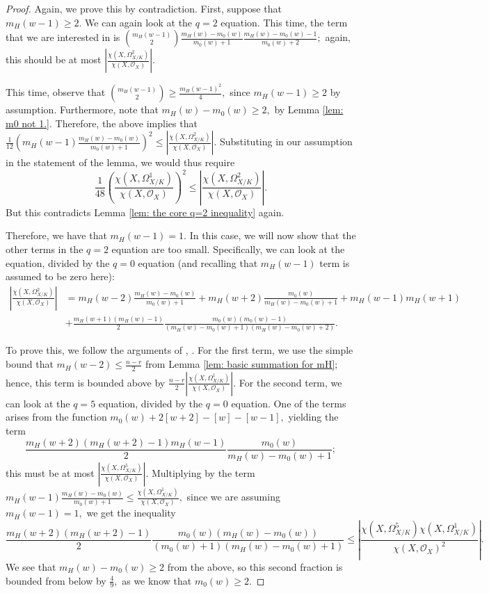 \documentclass{article}
\theoremstyle{definition}
\theoremstyle{remark}
\begin{document}
\begin{proof}
Again, we prove this by contradiction. First, suppose that $m_H(w-1) \geq 2.$ We can again look at the $q = 2$ equation. This time, the term that we are interested in is $\binom{m_H(w-1)}{2} \frac{m_H(w) - m_0(w)}{m_0(w) + 1} \frac{m_H(w) - m_0(w) - 1}{m_0(w) + 2};$ again, this should be at most $\left|\frac{\chi(X, \Omega^2_{X/K})}{\chi(X, \mathcal{O}_X)}\right|.$
\par This time, observe that $\binom{m_H(w-1)}{2} \geq \frac{m_H(w-1)^2}{4},$ since $m_H(w-1) \geq 2$ by assumption. Furthermore, note that $m_H(w) - m_0(w) \geq 2,$ by Lemma \ref{lem: m0 not 1.}. Therefore, the above implies that $\frac{1}{12} \left(m_H(w-1) \frac{m_H(w) - m_0(w)}{m_0(w) + 1}\right)^2 \leq \left|\frac{\chi(X, \Omega^2_{X/K})}{\chi(X, \mathcal{O}_X)}\right|.$ Substituting in our assumption in the statement of the lemma, we would thus require \[\frac{1}{48} \left(\frac{\chi(X, \Omega^1_{X/K})}{\chi(X, \mathcal{O}_X)}\right)^2 \leq \left|\frac{\chi(X, \Omega^2_{X/K})}{\chi(X, \mathcal{O}_X)}\right|.\] But this contradicts Lemma \ref{lem: the core q=2 inequality} again.
\par Therefore, we have that $m_H(w-1) = 1.$ In this case, we will now show that the other terms in the $q=2$ equation are too small. Specifically, we can look at the equation, divided by the $q = 0$ equation (and recalling that $m_H(w-1)$ term is assumed to be zero here):
\begin{align*} \left|\frac{\chi(X, \Omega^2_{X/K})}{\chi(X, \mathcal{O}_X)}\right|  & = m_H(w-2) \frac{m_H(w) - m_0(w)}{m_0(w) + 1} + m_H(w+2)\frac{m_0(w)}{m_H(w) - m_0(w) + 1} + m_H(w-1)m_H(w+1) \\ & + \frac{m_H(w+1)(m_H(w) - 1)}{2}\frac{m_0(w)(m_0(w) - 1)}{(m_H(w) - m_0(w) + 1)(m_H(w) - m_0(w) + 2)}.\end{align*}
\par To prove this, we follow the arguments of \cite[Lemma B.13]{ls25}, \cite[Lemma B.14]{ls25}. For the first term, we use the simple bound that $m_H(w-2) \leq \frac{n-r}{2}$ from Lemma \ref{lem: basic summation for mH}; hence, this term is bounded above by $\frac{n-r}{2} \left|\frac{\chi(X, \Omega^1_{X/K})}{\chi(X, \mathcal{O}_X)}\right|.$ For the second term, we can look at the $q = 5$ equation, divided by the $q = 0$ equation. One of the terms arises from the function $m_0(w) + 2[w+2] - [w] - [w-1],$ yielding the term $$\frac{m_H(w+2)(m_H(w+2) - 1)m_H(w-1)}{2} \frac{m_0(w)}{m_H(w) - m_0(w) + 1};$$ this must be at most $\left|\frac{\chi(X, \Omega^5_{X/K})}{\chi(X, \mathcal{O}_X)}\right|.$ Multiplying by the term $m_H(w-1) \frac{m_H(w) - m_0(w)}{m_0(w) + 1} \leq \frac{\chi(X, \Omega_{X/K}^1)}{\chi(X, \mathcal{O}_X)},$ since we are assuming $m_H(w-1) = 1,$ we get the inequality $$\frac{m_H(w+2)(m_H(w+2) - 1)}{2} \frac{m_0(w)(m_H(w) - m_0(w))}{(m_0(w) + 1)(m_H(w) - m_0(w) + 1)} \leq \left|\frac{\chi(X, \Omega_{X/K}^5)\chi(X, \Omega_{X/K}^1)}{\chi(X, \mathcal{O}_{X})^2}\right|.$$ We see that $m_H(w) - m_0(w) \geq 2$ from the above, so this second fraction is bounded from below by $\frac{4}{9},$ as we know that $m_0(w) \geq 2.$

\end{proof}
\end{document}
